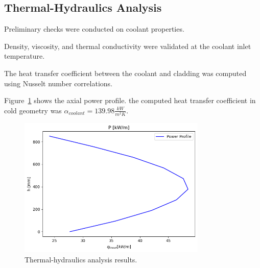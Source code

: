 \subsection{Thermal-Hydraulics Analysis}
Preliminary checks were conducted on coolant properties.

Density, viscosity, and thermal conductivity were validated at the coolant inlet temperature.

The heat transfer coefficient between the coolant and cladding was computed using Nusselt number correlations.

Figure~\ref{fig:thermal_hydraulics} shows the axial power profile. the computed heat transfer coefficient in cold geometry was $\alpha_{coolant} = 139.98 \frac{kW}{m^2 K}$.

\begin{figure}[H]
    \centering
    \includegraphics[width=0.8\textwidth]{power_profile.png}
    \caption{Thermal-hydraulics analysis results.}
    \label{fig:thermal_hydraulics}
    \end{figure}